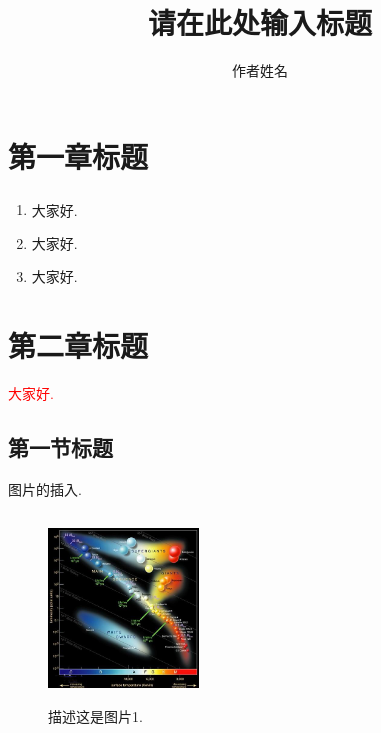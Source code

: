 \documentclass[UTF8, a4paper]{ctexart}
\title{{\Huge 请在此处输入标题}}
\author{作者姓名}
\numberwithin{equation}{section} %
\newcommand{\tcr}{\textcolor{blue}}
\newcommand{\upcite}[1]{\textsuperscript{\textsuperscript{\tcr{\cite{#1}}}}}
\begin{document}
\maketitle

\tableofcontents %
\newpage



\section{第一章标题}

	\begin{enumerate}
	\item 大家好\upcite{ref1}.

	\item 大家好\cite{ref1,ref2}.

	\item 大家好.
	\end{enumerate}

\section{第二章标题}

	\textcolor{red}{大家好.}

	\subsection{第一节标题}

		图片的插入.

		\begin{figure}[h]
			\centering
			\includegraphics[width=4cm,height=5cm]{2-1.png}
			\caption{描述这是图片1.}
		\end{figure}
\end{document}
